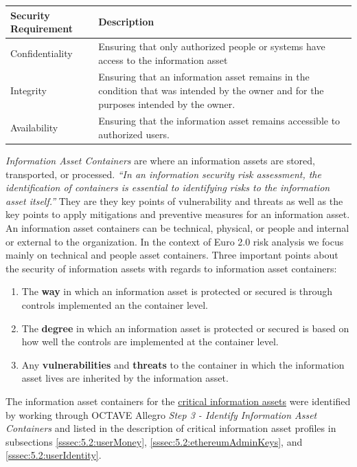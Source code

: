 \documentclass[12pt]{article} %
\begin{document}
{\begin{center}
\begin{tabular}{ | l | p{10.5cm} | }
  \hline
  \textbf{Security Requirement} & \textbf{Description}
  \\ \hline
  Confidentiality & Ensuring that only authorized people or systems have access to the information asset
  \\ \hline
  Integrity & Ensuring that an information asset remains in the condition that was intended by the owner and for the purposes intended by the owner.
  \\ \hline
  Availability & Ensuring that the information asset remains accessible to authorized users.
  \\ \hline
\end{tabular}
\end{center}
\label{tab:securityRequirements}

\textit{Information Asset Containers} are where an information assets are stored, transported, or processed. \textit{``In an information security risk assessment, the identification of containers is essential to identifying risks to the information asset itself.''} They are they key points of vulnerability and threats as well as the key points to apply mitigations and preventive measures for an information asset. An information asset containers can be technical, physical, or people and internal or external to the organization.  In the context of Euro 2.0 risk analysis we focus mainly on technical and people asset containers. Three important points about the security of information assets with regards to information asset containers:

\begin{enumerate}
	\item The \textbf{way} in which an information asset is protected or secured is through controls implemented an the container level.
	\item The \textbf{degree} in which an information asset is protected or secured is based on how well the controls are implemented at the container level.
	\item Any \textbf{vulnerabilities} and \textbf{threats} to the container in which the information asset lives are inherited by the information asset.
\end{enumerate}

The information asset containers for the \hyperref[enum:criticalInformationAssets]{critical information assets} were identified by working through OCTAVE Allegro \textit{Step 3 - Identify Information Asset Containers} and listed in the description of critical information asset profiles in subsections \ref{sssec:5.2:userMoney}, \ref{sssec:5.2:ethereumAdminKeys}, and \ref{sssec:5.2:userIdentity}.

}
\end{document}
